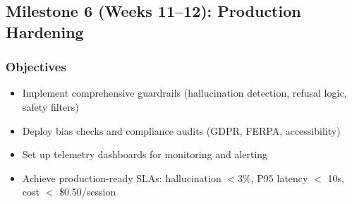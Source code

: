 \documentclass[11pt,letterpaper]{article}
\begin{document}
\subsection{Milestone 6 (Weeks 11--12): Production Hardening}\label{subsec:milestone-6}

\subsubsection{Objectives}
\begin{itemize}
\item Implement comprehensive guardrails (hallucination detection, refusal logic, safety filters)
\item Deploy bias checks and compliance audits (GDPR, FERPA, accessibility)
\item Set up telemetry dashboards for monitoring and alerting
\item Achieve production-ready SLAs: hallucination $< 3\%$, P95 latency $<$ 10s, cost $<$ \$0.50/session
\end{itemize}
\end{document}
